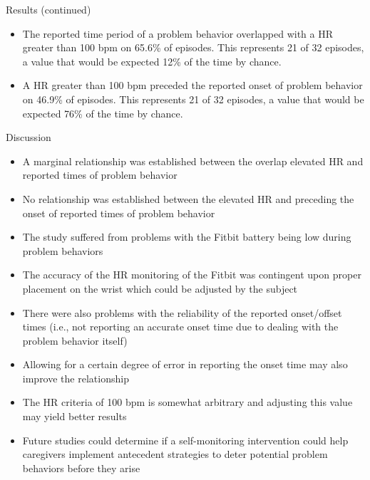 \documentclass[final]{beamer}
\newlength{\onecolwid}
\begin{document}
\begin{frame}[t]
\begin{columns}[t]
\begin{column}{\onecolwid}
\begin{alertblock}{Results (continued)}
	\begin{itemize}
		\item The reported time period of a problem behavior overlapped with a HR greater than 100 bpm on 65.6\% of episodes. This represents 21 of 32 episodes, a value that would be expected 12\% of the time by chance.
		\item A HR greater than 100 bpm preceded the reported onset of problem behavior on 46.9\% of episodes. This represents 21 of 32 episodes, a value that would be expected 76\% of the time by chance.
		
	\end{itemize}
	
\end{alertblock}


\begin{alertblock}{Discussion}
	
	\begin{itemize}
		\item A marginal relationship was established between the overlap elevated HR and reported times of problem behavior
		\item No relationship was established between the elevated HR and preceding the onset of reported times of problem behavior
		\item The study suffered from problems with the Fitbit battery being low during problem behaviors
		\item The accuracy of the HR monitoring of the Fitbit was contingent upon proper placement on the wrist which could be adjusted by the subject
		\item There were also problems with the reliability of the reported onset/offset times (i.e., not reporting an accurate onset time due to dealing with the problem behavior itself)
		\item Allowing for a certain degree of error in reporting the onset time may also improve the relationship
		\item The HR criteria of 100 bpm is somewhat arbitrary and adjusting this value may yield better results
		\item Future studies could determine if a self-monitoring intervention could help caregivers implement antecedent strategies to deter potential problem behaviors before they arise
	\end{itemize}
	

\end{alertblock}
\end{column}
\end{columns}
\end{frame}
\end{document}
